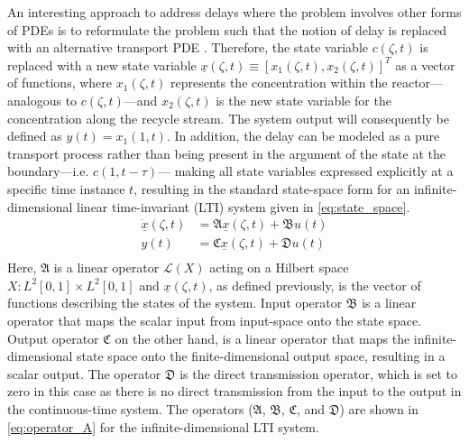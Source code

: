 An interesting approach to address delays where the problem involves other forms of PDEs is to reformulate the problem such that the notion of delay is replaced with an alternative transport PDE \cite{krstic2009book}. 
Therefore, the state variable $c(\zeta,t)$ is replaced with a new state variable $\underline{x}(\zeta, t) \equiv [x_1(\zeta, t), x_2(\zeta, t)]^T$ as a vector of functions, where $x_1(\zeta, t)$ represents the concentration within the reactor—analogous to $c(\zeta,t)$—and $x_2(\zeta, t)$ is the new state variable for the concentration along the recycle stream. The system output will consequently be defined as $y(t) = x_1(1, t)$. In addition, the delay can be modeled as a pure transport process rather than being present in the argument of the state at the boundary—i.e. $c(1,t-\tau)$— making all state variables expressed explicitly at a specific time instance $t$, resulting in the standard state-space form for an infinite-dimensional linear time-invariant (LTI) system given in \eqref{eq:state_space}.
\begin{equation} \label{eq:state_space}
    \begin{aligned}
        \dot{\underline{x}}(\zeta, t) &= \mathfrak{A} \underline{x}(\zeta, t) + \mathfrak{B} u(t) \\
        y(t) &= \mathfrak{C} \underline{x}(\zeta, t) + \mathfrak{D} u(t) \\
    \end{aligned}
\end{equation}
Here, $\mathfrak{A}$ is a linear operator $\mathcal{L}(X)$ acting on a Hilbert space $X: L^2[0,1] \times L^2[0,1]$ and $\underline{x}(\zeta,t)$, as defined previously, is the vector of functions describing the states of the system. Input operator $\mathfrak{B}$ is a linear operator that maps the scalar input from input-space onto the state space. Output operator $\mathfrak{C}$ on the other hand, is a linear operator that maps the infinite-dimensional state space onto the finite-dimensional output space, resulting in a scalar output. The operator $\mathfrak{D}$ is the direct transmission operator, which is set to zero in this case as there is no direct transmission from the input to the output in the continuous-time system. The operators ($\mathfrak{A}$, $\mathfrak{B}$, $\mathfrak{C}$, and $\mathfrak{D}$) are shown in \eqref{eq:operator_A} for the infinite-dimensional LTI system.

